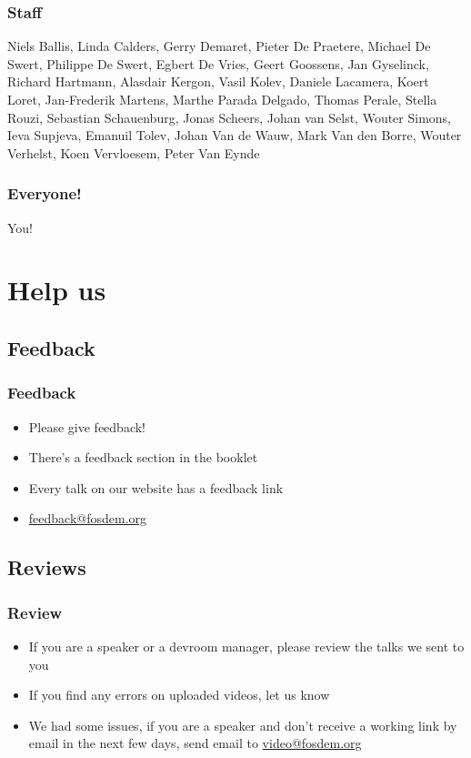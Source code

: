 \documentclass[aspectratio=169]{beamer}
\begin{document}
\begin{frame}
	\frametitle{Staff}
	\vfill
Niels Ballis, Linda Calders, Gerry Demaret, Pieter De Praetere, Michael De Swert, Philippe De Swert, Egbert De Vries, Geert Goossens, Jan Gyselinck, Richard Hartmann, Alasdair Kergon, Vasil Kolev, Daniele Lacamera, Koert Loret, Jan-Frederik Martens, Marthe Parada Delgado, Thomas Perale, Stella Rouzi, Sebastian Schauenburg, Jonas Scheers, Johan van Selst, Wouter Simons, Ieva Supjeva, Emanuil Tolev, Johan Van de Wauw, Mark Van den Borre, Wouter Verhelst, Koen Vervloesem, Peter Van Eynde
	\vfill
\end{frame}

\begin{frame}
	\frametitle{Everyone!}
	\vfill
	\begin{center}
	{\Huge You!}
	\end{center}
	\vfill
\end{frame}


\section{Help us}

\subsection{Feedback}

\begin{frame}
	\frametitle{Feedback}
	\vfill
	\begin{itemize}
		\item Please give feedback!
		\item There's a feedback section in the booklet
		\item Every talk on our website has a feedback link
		\item \url{feedback@fosdem.org}
	\end{itemize}
	\vfill
\end{frame}

\subsection{Reviews}

\begin{frame}
	\frametitle{Review}
	\vfill
	\begin{itemize}
		\item If you are a speaker or a devroom manager, please review the talks we sent to you
		\item If you find any errors on uploaded videos, let us know
		\item We had some issues, if you are a speaker and don't receive a working link by email in the next few days, send email to \url{video@fosdem.org}
	\end{itemize}
	\vfill
\end{frame}
\end{document}
